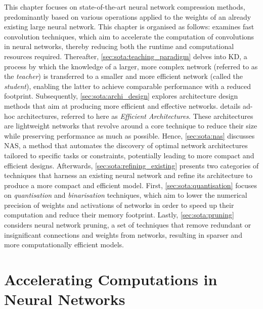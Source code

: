 This chapter focuses on state-of-the-art neural network compression methods,
predominantly based on various operations applied to the weights of an already
existing large neural network. This chapter is organised as follows:
 examines fast convolution techniques, which
aim to accelerate the computation of convolutions in neural networks, thereby
reducing both the runtime and computational resources required. Thereafter,
\cref{sec:sota:teaching_paradigm} delves into \ac{KD}, a process by which the
knowledge of a larger, more complex network (referred to as the \emph{teacher})
is transferred to a smaller and more efficient network (called the
\emph{student}), enabling the latter to achieve comparable performance with a
reduced footprint. Subsequently, \cref{sec:sota:archi_design} explores
architecture design methods that aim at producing more efficient and effective
networks.  details ad-hoc architectures, referred
to here as \emph{Efficient Architectures}. These architectures are lightweight
networks that revolve around a core technique to reduce their size while
preserving performance as much as possible. Hence, \cref{sec:sota:nas} discusses
\ac{NAS}, a method that automates the discovery of optimal network architectures
tailored to specific tasks or constraints, potentially leading to more compact
and efficient designs. Afterwards, \cref{sec:sota:refining_existing} presents
two categories of techniques that harness an existing neural network and refine
its architecture to produce a more compact and efficient model. First,
\cref{sec:sota:quantisation} focuses on \emph{quantisation} and
\emph{binarisation} techniques, which aim to lower the numerical precision of
weights and activations of networks in order to speed up their computation and
reduce their memory footprint. Lastly, \cref{sec:sota:pruning} considers neural
network pruning, a set of techniques that remove redundant or insignificant
connections and weights from networks, resulting in sparser and more
computationally efficient models.\\



\section{Accelerating Computations in Neural Networks}\label{sec:sota:fast_convolutions}

